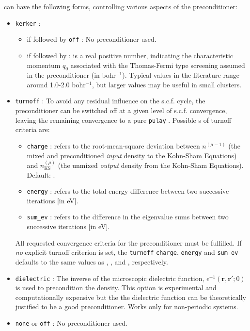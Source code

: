  can have the following forms, controlling various
aspects of the preconditioner:
\begin{itemize}
  \item \texttt{kerker} :
    \begin{itemize}
      \item if followed by \texttt{off} : No preconditioner used.
      \item if followed by  :  is a real
        positive number, indicating the characteristic momentum $q_0$
        associated with the Thomas-Fermi type screening assumed in the
        preconditioner (in bohr$^{-1}$). Typical values in the
        literature range around 1.0-2.0 bohr$^{-1}$, but larger values
        may be useful in small clusters.
    \end{itemize}
  \item \texttt{turnoff} : To avoid any residual influence on the
    s.c.f. cycle, the preconditioner can be switched off at a given
    level of s.c.f. convergence, leaving the remaining convergence to
    a pure \texttt{pulay} . Possible s of
    turnoff criteria are:
    \begin{itemize}
      \item \texttt{charge} :  refers to the
        root-mean-square deviation between $n^{(\mu-1)}$ (the mixed
        and preconditioned \emph{input} density to the Kohn-Sham
        Equations) and $n_\text{KS}^{(\mu)}$ (the unmixed
        \emph{output} density from the Kohn-Sham Equations). Default:
        .
      \item \texttt{energy} :  refers to the total
        energy difference between two successive iterations [in eV].
      \item \texttt{sum\_ev} :  refers to the
        difference in the eigenvalue sums between two successive
        iterations [in eV].
    \end{itemize}
    All requested convergence criteria for the preconditioner must be
    fulfilled. If \emph{no} explicit turnoff criterion is set, the
     \texttt{turnoff} \texttt{charge},
    \texttt{energy} and \texttt{sum\_ev} defaults
    to the same values as ,
    , and ,
    respectively.
  \item \texttt{dielectric} : The inverse of the microscopic dielectric function,
    $\epsilon^{-1}(\mathbf{r},\mathbf{r}' ; 0)$ is used to precondition the density. This
    option is experimental and computationally expensive but the the dielectric function
    can be theoretically justified to be a good preconditioner. Works only for non-periodic systems.
  \item \texttt{none} or \texttt{off} : No preconditioner used.
\end{itemize}

